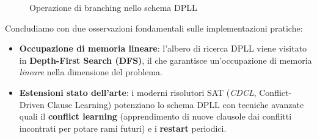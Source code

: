 \begin{figure}[!ht]
    \centering
    \caption{Operazione di branching nello schema DPLL}
    \label{fig:06_02_DPLL_BranchTree}
\end{figure}

\begin{remark}
    Concludiamo con due osservazioni fondamentali sulle implementazioni pratiche:
    \begin{itemize}
        \item \textbf{Occupazione di memoria lineare}: l'albero di ricerca DPLL viene 
            visitato in \textbf{Depth-First Search (DFS)}, il che garantisce un'occupazione 
            di memoria \textit{lineare} nella dimensione del problema.
        \item \textbf{Estensioni stato dell'arte}: i moderni risolutori SAT (\textit{CDCL}, 
            Conflict-Driven Clause Learning) potenziano lo schema DPLL con tecniche 
            avanzate quali il \textbf{conflict learning} (apprendimento di nuove clausole 
            dai conflitti incontrati per potare rami futuri) e i \textbf{restart} periodici.
    \end{itemize}
\end{remark}
